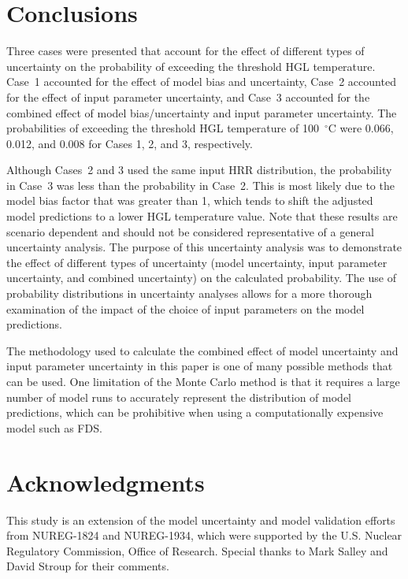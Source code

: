 \documentclass[12pt]{article}
\begin{document}
\clearpage


\section{Conclusions}
\label{sec:conclusions}

Three cases were presented that account for the effect of different types of uncertainty on the probability of exceeding the threshold HGL temperature. Case~1 accounted for the effect of model bias and uncertainty, Case~2 accounted for the effect of input parameter uncertainty, and Case~3 accounted for the combined effect of model bias/uncertainty and input parameter uncertainty. The probabilities of exceeding the threshold HGL temperature of 100~$^\circ$C were 0.066, 0.012, and 0.008 for Cases 1, 2, and 3, respectively.

Although Cases~2 and 3 used the same input HRR distribution, the probability in Case~3 was less than the probability in Case~2. This is most likely due to the model bias factor that was greater than 1, which tends to shift the adjusted model predictions to a lower HGL temperature value. Note that these results are scenario dependent and should not be considered representative of a general uncertainty analysis. The purpose of this uncertainty analysis was to demonstrate the effect of different types of uncertainty (model uncertainty, input parameter uncertainty, and combined uncertainty) on the calculated probability. The use of probability distributions in uncertainty analyses allows for a more thorough examination of the impact of the choice of input parameters on the model predictions.

The methodology used to calculate the combined effect of model uncertainty and input parameter uncertainty in this paper is one of many possible methods that can be used. One limitation of the Monte Carlo method is that it requires a large number of model runs to accurately represent the distribution of model predictions, which can be prohibitive when using a computationally expensive model such as FDS.


\section{Acknowledgments}
\label{sec:acknowledgments}

This study is an extension of the model uncertainty and model validation efforts from NUREG-1824 and NUREG-1934, which were supported by the U.S. Nuclear Regulatory Commission, Office of Research. Special thanks to Mark Salley and David Stroup for their comments.




\end{document}
